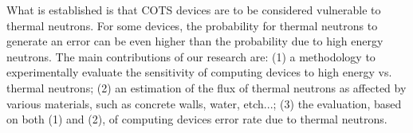 What is established is that COTS devices are to be considered vulnerable to thermal neutrons. For some devices, the probability for thermal neutrons to generate an error can be even higher than the probability due to high energy neutrons.  
The main contributions of our research are: (1) a methodology to experimentally evaluate the sensitivity of computing devices to high energy vs. thermal neutrons; (2) an estimation of the flux of thermal neutrons as affected by various materials, such as concrete walls, water, etch...; (3) the evaluation, based on both (1) and (2), of computing devices error rate due to thermal neutrons. 



